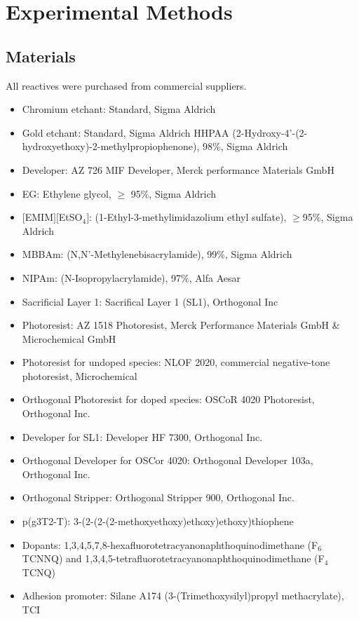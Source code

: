 \chapter{Experimental Methods} \label{cha:2}

\section{Materials}
All reactives were purchased from commercial suppliers. %

\begin{itemize}
\item Chromium etchant: Standard, Sigma Aldrich
\item Gold etchant: Standard, Sigma Aldrich HHPAA (2-Hydroxy-4’-(2-hydroxyethoxy)-2-methylpropiophenone), 98$\%$, Sigma Aldrich 
\item Developer: AZ 726 MIF Developer, Merck performance Materials GmbH
\item EG: Ethylene glycol, $\geq$ 95$\%$, Sigma Aldrich
\item $[$EMIM$][$EtSO$_{4}]$: (1-Ethyl-3-methylimidazolium ethyl sulfate), $\geq$95$\%$, Sigma Aldrich 
\item MBBAm: (N,N’-Methylenebisacrylamide), 99$\%$, Sigma Aldrich 
\item NIPAm: (N-Isopropylacrylamide), 97$\%$, Alfa Aesar 
\item Sacrificial Layer 1: Sacrifical Layer 1 (SL1), Orthogonal Inc
\item Photoresist: AZ 1518 Photoresist, Merck Performance Materials GmbH \& Microchemical GmbH
\item Photoresist for undoped species: NLOF 2020, commercial negative-tone photoresist, Microchemical
\item Orthogonal Photoresist for doped species: OSCoR 4020 Photoresist, Orthogonal Inc.
\item Developer for SL1: Developer HF 7300, Orthogonal Inc.
\item Orthogonal Developer for OSCor 4020: Orthogonal Developer 103a, Orthogonal Inc.
\item Orthogonal Stripper: Orthogonal Stripper 900, Orthogonal Inc. 
\item p(g3T2-T): 3-(2-(2-(2-methoxyethoxy)ethoxy)ethoxy)thiophene
\item Dopants: 1,3,4,5,7,8-hexafluorotetracyanonaphthoquinodimethane (F$_{6}$TCNNQ) and 1,3,4,5-tetrafluorotetracyanonaphthoquinodimethane (F$_{4}$TCNQ)
\item Adhesion promoter: Silane A174 (3-(Trimethoxysilyl)propyl methacrylate), TCI

\end{itemize}

